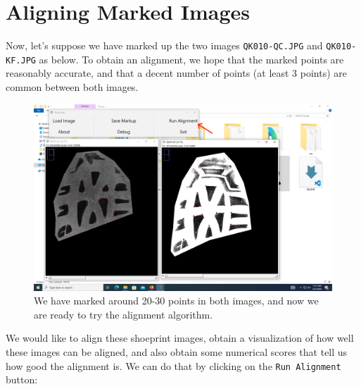 \documentclass{csafedoc}
\begin{document}
\section{Aligning Marked Images}%

Now, let's suppose we have marked up the two images \texttt{QK010-QC.JPG} and
\texttt{QK010-KF.JPG} as below. To obtain an alignment, we hope that the marked points are
reasonably accurate, and that a decent number of points (at least 3 points) are common
between both images.

\begin{figure}[H]
	\begin{center}
		\includegraphics[width=0.8\linewidth]{images/step_6-anno.png}
	\end{center}
	\caption{We have marked around 20-30 points in both images, and now we are ready to try the alignment algorithm.}
	\label{fig:step6}
\end{figure}

We would like to align these shoeprint images, obtain a visualization of how well these
images can be aligned, and also obtain some numerical scores that tell us how good the
alignment is. We can do that by clicking on the \texttt{Run Alignment} button:
\end{document}
